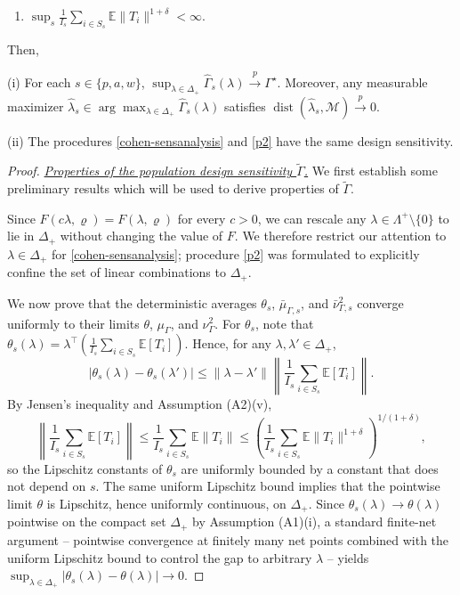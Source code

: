 \documentclass[12pt,leqno,titlepage]{amsart}
\newcommand{\1}{\mathbbm{1}}
\begin{document}
\begin{bibunit}
{\begin{enumerate}[label=(\roman*)]
\item $
\sup_s \frac1{I_s}\sum_{i\in S_s}\mathbb E\|T_i\|^{1+\delta}<\infty.
$
\end{enumerate}

\medskip

Then,


\noindent\textup{(i)} For each \(s\in\{p,a,w\}\),
$
\sup_{\lambda\in\Delta_+}\widehat\Gamma_s(\lambda)
\xrightarrow{p}
\Gamma^\star.
$
Moreover, any measurable maximizer \(\widehat\lambda_s\in
\arg\max_{\lambda\in\Delta_+}\widehat\Gamma_s(\lambda)\) satisfies
$
\operatorname{dist}(\widehat\lambda_s,\mathcal M)\xrightarrow{p}0.
$

\noindent\textup{(ii)} The procedures \eqref{cohen-sensanalysis} and \eqref{p2} have the same design sensitivity.

\begin{proof} \text{  }

\medskip

\noindent\textit{\underline{Properties of the population design sensitivity $\widetilde\Gamma$.}}
We first establish some preliminary results which will be used to derive properties of $\widetilde\Gamma.$

Since \(F(c\lambda,\varrho)=F(\lambda,\varrho)\) for every \(c>0\), we can rescale any \(\lambda\in\Lambda^+ \setminus \{0\} \) to lie in \(\Delta_+\) without changing the value of \(F\). We therefore restrict our attention to \(\lambda\in\Delta_+\) for \eqref{cohen-sensanalysis}; procedure \eqref{p2} was formulated to explicitly confine the set of linear combinations to $\Delta_+$.

We now prove that the deterministic averages $\theta_s$, $\bar\mu_{\Gamma,s}$, and $\bar\nu_{\Gamma,s}^2$ converge uniformly to their limits $\theta$, $\mu_\Gamma$, and $\nu_\Gamma^2$. For \(\theta_s\), note that
$
\theta_s(\lambda)=\lambda^\top\left(\frac1{I_s}\sum_{i\in S_s}\mathbb E[T_i]\right).
$
Hence, for any \(\lambda,\lambda'\in\Delta_+\),
\[
|\theta_s(\lambda)-\theta_s(\lambda')|
\le
\|\lambda-\lambda'\|
\left\|\frac1{I_s}\sum_{i\in S_s}\mathbb E[T_i]\right\|.
\]
By Jensen's inequality and Assumption \textup{(A2)(v)},
\[
\left\|\frac1{I_s}\sum_{i\in S_s}\mathbb E[T_i]\right\|
\le
\frac1{I_s}\sum_{i\in S_s}\mathbb E\|T_i\|
\le
\left(\frac1{I_s}\sum_{i\in S_s}\mathbb E\|T_i\|^{1+\delta}\right)^{1/(1+\delta)},
\]
so the Lipschitz constants of \(\theta_s\) are uniformly bounded by a constant that does not depend on \(s\). The same uniform Lipschitz bound implies that the pointwise limit \(\theta\) is Lipschitz, hence uniformly continuous, on \(\Delta_+\). Since \(\theta_s(\lambda)\to\theta(\lambda)\) pointwise on the compact set \(\Delta_+\) by Assumption \textup{(A1)(i)}, a standard finite-net argument \citep[Ch. 5]{wainwright2019high} -- pointwise convergence at finitely many net points combined with the uniform Lipschitz bound to control the gap to arbitrary $\lambda$ -- yields
$
\sup_{\lambda\in\Delta_+}|\theta_s(\lambda)-\theta(\lambda)|\to 0.
$


\end{proof}}
\end{bibunit}
\end{document}
